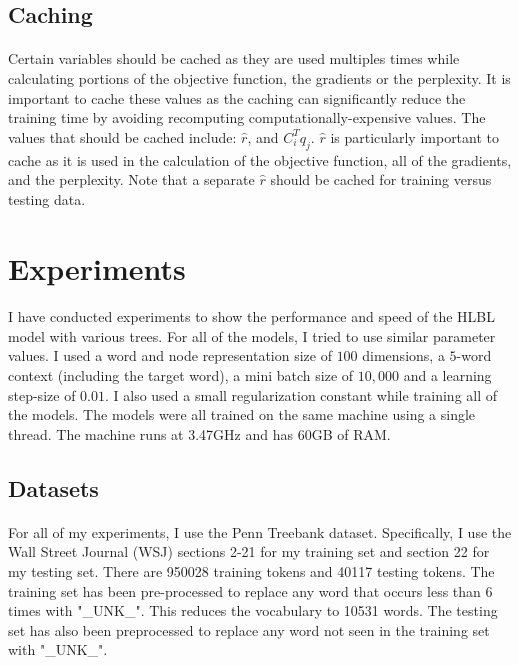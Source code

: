 \documentclass[12pt]{ociamthesis}  %
\begin{document}
\subsection{Caching}
\paragraph{}
Certain variables should be cached as they are used multiples times while calculating portions of the objective function, the gradients or the perplexity. It is important to cache these values as the caching can significantly reduce the training time by avoiding recomputing computationally-expensive values. The values that should be cached include: $\hat{r}$, and $C_i^T q_j$. $\hat{r}$ is particularly important to cache as it is used in the calculation of the objective function, all of the gradients, and the perplexity. Note that a separate $\hat{r}$ should be cached for training versus testing data.

\section{Experiments} \label{sec:experiments}
\paragraph{}
I have conducted experiments to show the performance and speed of the HLBL model with various trees. For all of the models, I tried to use similar parameter values. I used a word and node representation size of $100$ dimensions, a $5$-word context (including the target word), a mini batch size of $10,000$ and a learning step-size of $0.01$. I also used a small regularization constant while training all of the models. The models were all trained on the same machine using a single thread. The machine runs at 3.47GHz and has 60GB of RAM.

\subsection{Datasets}
\paragraph{}
For all of my experiments, I use the Penn Treebank dataset. Specifically, I use the Wall Street Journal (WSJ) sections 2-21 for my training set and section 22 for my testing set. There are 950028 training tokens and 40117 testing tokens. The training set has been pre-processed to replace any word that occurs less than 6 times with "\_UNK\_". This reduces the vocabulary to 10531 words. The testing set has also been preprocessed to replace any word not seen in the training set with "\_UNK\_".
\end{document}
